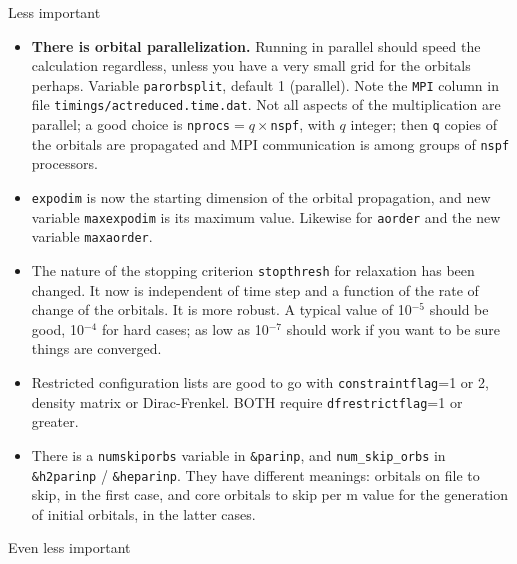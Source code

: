 \documentclass[10pt,leqno, oneside]{book}
\begin{document}
%
Less important
\begin{itemize}
%
\item{\textbf{There is orbital parallelization.}  Running in parallel should speed the calculation regardless, unless you have a very small grid for the orbitals perhaps.
Variable \verb#parorbsplit#, default 1 (parallel).  Note the \verb#MPI# column in file \verb#timings/actreduced.time.dat#.  Not all aspects of the multiplication are
parallel; a good choice is \verb#nprocs#$=q\times$\verb#nspf#, with $q$ integer; then \verb#q# copies of the orbitals are propagated and MPI communication is among groups of
\verb#nspf# processors.}
%
\item{\verb#expodim# is now the starting dimension of the orbital propagation, and new variable \verb#maxexpodim# is its maximum value.  Likewise for \verb#aorder# and the new variable \verb#maxaorder#.}
%
\item{The nature of the stopping criterion \verb#stopthresh# for relaxation has been changed.  It now is independent of time step and a function of the rate of change of the orbitals.  It is more robust.  A typical value of 10$^{-5}$ should be good, 10$^{-4}$ for hard cases; as low as 10$^{-7}$ should work if you want to be sure things are converged.}
%
\item{Restricted configuration lists are good to go with \verb#constraintflag#=1 or 2, density matrix or Dirac-Frenkel.  BOTH require \verb#dfrestrictflag#=1 or greater.}
%
\item{There is a \verb#numskiporbs# variable in \verb#&parinp#, and \verb#num_skip_orbs# in \verb#&h2parinp# / \verb#&heparinp#.  They have different meanings: 
orbitals on file to skip, in the first case, and core orbitals to skip per m value for the generation of initial orbitals, in the latter cases.}
\end{itemize}
%
Even less important
%
\end{document}
